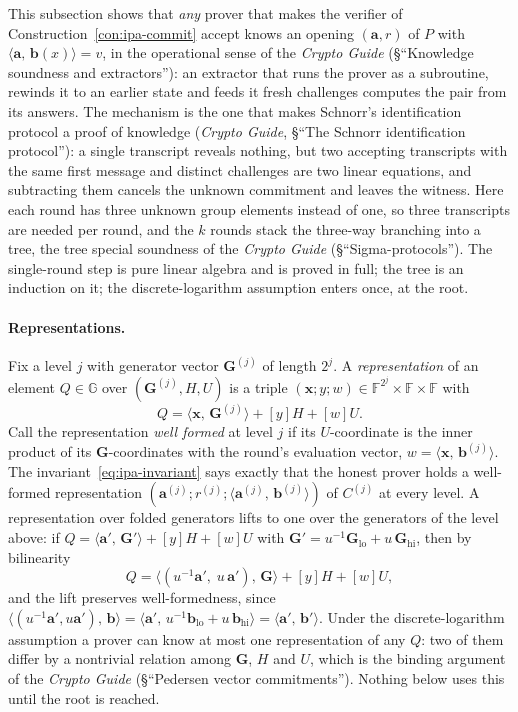 \documentclass[11pt,a4paper]{article}
\theoremstyle{definition}
\newcommand{\F}{\mathbb{F}}
\newcommand{\G}{\mathbb{G}}
\newcommand{\ip}[2]{\langle #1,\, #2 \rangle}
\begin{document}
This subsection shows that \emph{any} prover that makes the verifier of
Construction~\ref{con:ipa-commit} accept knows an opening
$(\mathbf a, r)$ of $P$ with $\ip{\mathbf a}{\mathbf b(x)} = v$, in the
operational sense of the \emph{Crypto Guide} (\S``Knowledge soundness
and extractors''): an extractor that runs the prover as a subroutine,
rewinds it to an earlier state and feeds it fresh challenges computes
the pair from its answers. The mechanism is the one that makes
Schnorr's identification protocol a proof of knowledge (\emph{Crypto
Guide}, \S``The Schnorr identification protocol''): a single transcript
reveals nothing, but two accepting transcripts with the same first
message and distinct challenges are two linear equations, and
subtracting them cancels the unknown commitment and leaves the witness.
Here each round has three unknown group elements instead of one, so
three transcripts are needed per round, and the $k$ rounds stack the
three-way branching into a tree, the tree special soundness of the
\emph{Crypto Guide} (\S``Sigma-protocols''). The single-round step is
pure linear algebra and is proved in full; the tree is an induction on
it; the discrete-logarithm assumption enters once, at the root.

\paragraph{Representations.}
Fix a level $j$ with generator vector $\mathbf G^{(j)}$ of length
$2^{j}$. A \emph{representation} of an element $Q \in \G$ over
$(\mathbf G^{(j)}, H, U)$ is a triple $(\mathbf x; y; w) \in \F^{2^{j}}
\times \F \times \F$ with
\[
Q = \ip{\mathbf x}{\mathbf G^{(j)}} + [y]H + [w]U .
\]
Call the representation \emph{well formed} at level $j$ if its
$U$-coordinate is the inner product of its $\mathbf G$-coordinates with
the round's evaluation vector, $w = \ip{\mathbf x}{\mathbf b^{(j)}}$.
The invariant~\eqref{eq:ipa-invariant} says exactly that the honest
prover holds a well-formed representation
$(\mathbf a^{(j)}; r^{(j)}; \ip{\mathbf a^{(j)}}{\mathbf b^{(j)}})$ of
$C^{(j)}$ at every level. A representation over folded generators
lifts to one over the generators of the level above: if
$Q = \ip{\mathbf a'}{\mathbf G'} + [y]H + [w]U$ with
$\mathbf G' = u^{-1}\mathbf G_{\mathrm{lo}} + u\,\mathbf G_{\mathrm{hi}}$,
then by bilinearity
\begin{equation}\label{eq:ipa-lift}
Q = \ip{(u^{-1}\mathbf a',\; u\,\mathbf a')}{\mathbf G} + [y]H + [w]U ,
\end{equation}
and the lift preserves well-formedness, since
$\ip{(u^{-1}\mathbf a', u\mathbf a')}{\mathbf b}
 = \ip{\mathbf a'}{u^{-1}\mathbf b_{\mathrm{lo}} + u\,\mathbf b_{\mathrm{hi}}}
 = \ip{\mathbf a'}{\mathbf b'}$. Under the discrete-logarithm
assumption a prover can know at most one representation of any $Q$:
two of them differ by a nontrivial relation among $\mathbf G$, $H$ and
$U$, which is the binding argument of the \emph{Crypto Guide}
(\S``Pedersen vector commitments''). Nothing below uses this until the
root is reached.
\end{document}
